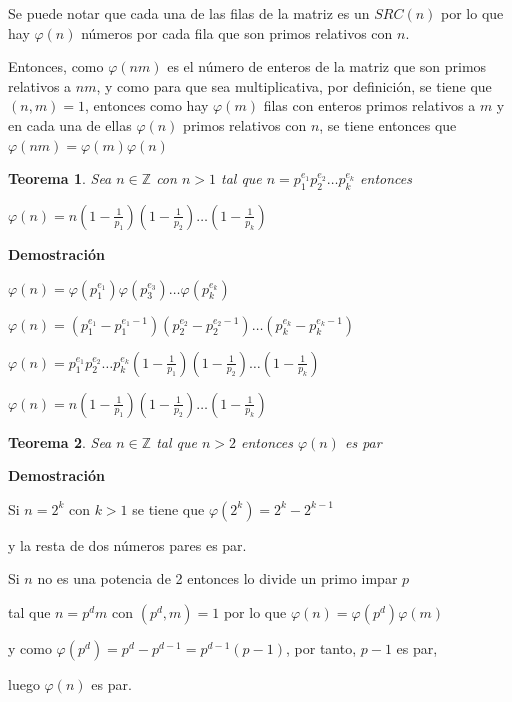 \documentclass[a4paper,12pt]{report}
\newtheorem*{teo}{Teorema}
\begin{document}
Se puede notar que cada una de las filas de la matriz es un $SRC(n)$ por lo que hay $\varphi(n)$ números por cada fila que son primos relativos con $n$.

Entonces, como $\varphi(nm)$ es el número de enteros de la matriz que son primos relativos a $nm$, y como para que sea multiplicativa, por definición, se tiene que $(n,m)=1$, entonces como hay $\varphi(m)$ filas con enteros primos relativos a $m$ y en cada una de ellas $\varphi(n)$ primos relativos con $n$, se tiene entonces que $\varphi(nm)=\varphi(m)\varphi(n)$

\begin{teo}
 Sea $n\in\mathbb{Z}$ con $n>1$ tal que $n=p_1^{e_1}p_2^{e_2}\dots p_k^{e_k}$ entonces

 $\varphi(n)=n(1-\frac{1}{p_1})(1-\frac{1}{p_2})\dots(1-\frac{1}{p_k})$
\end{teo}

\textbf{Demostración}

$\varphi(n)=\varphi(p_1^{e_1})\varphi(p_3^{e_3})\dots\varphi(p_k^{e_k})$

$\varphi(n)=(p_1^{e_1}-p_1^{e_1-1})(p_2^{e_2}-p_2^{e_2-1})\dots(p_k^{e_k}-p_k^{e_k-1})$

$\varphi(n)=p_1^{e_1}p_2^{e_2}\dots p_k^{e_k}(1-\frac{1}{p_1})(1-\frac{1}{p_2})\dots(1-\frac{1}{p_k})$

$\varphi(n)=n(1-\frac{1}{p_1})(1-\frac{1}{p_2})\dots(1-\frac{1}{p_k})$

\newpage

\begin{teo}
 Sea $n\in\mathbb{Z}$ tal que $n>2$ entonces $\varphi(n)$ es par
\end{teo}


\textbf{Demostración}

Si $n=2^k$ con $k>1$ se tiene que $\varphi(2^k)=2^k-2^{k-1}$

y la resta de dos números pares es par.

Si $n$ no es una potencia de 2 entonces lo divide un primo impar $p$

tal que $n=p^dm$ con $(p^d,m)=1$ por lo que $\varphi(n)=\varphi(p^d)\varphi(m)$

y como $\varphi(p^d)=p^d-p^{d-1}=p^{d-1}(p-1)$, por tanto, $p-1$ es par,

luego  $\varphi(n)$ es par.
\end{document}
